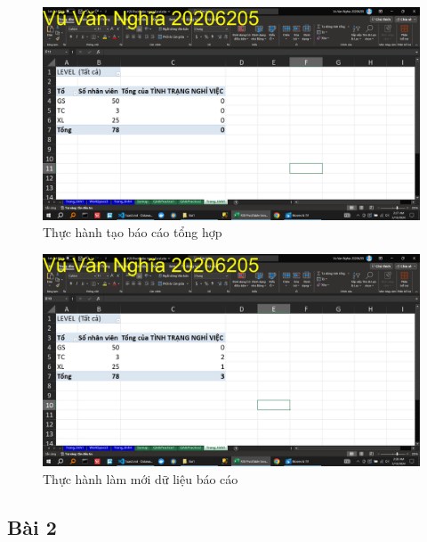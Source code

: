 \documentclass{article}
\begin{document}
\begin{figure}[H]
    \centering
    \includegraphics[scale = 0.15]{Bai1/ThucHanh/1.png}
    \caption{Thực hành tạo báo cáo tổng hợp}
\end{figure}






\begin{figure}[H]
    \centering
    \includegraphics[scale = 0.15]{Bai1/ThucHanh/2.png}
    \caption{Thực hành làm mới dữ liệu báo cáo}
\end{figure}







\subsection{Bài 2}
\end{document}
